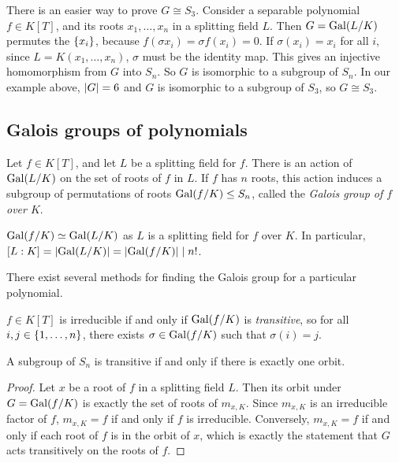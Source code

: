 There is an easier way to prove \( G \cong S_3 \).
Consider a separable polynomial \( f \in K[T] \), and its roots \( x_1, \dots, x_n \) in a splitting field \( L \).
Then \( G = \operatorname{Gal}(L / K) \) permutes the \( \qty{x_i} \), because \( f(\sigma x_i) = \sigma f(x_i) = 0 \).
If \( \sigma(x_i) = x_i \) for all \( i \), since \( L = K(x_1, \dots, x_n) \), \( \sigma \) must be the identity map.
This gives an injective homomorphism from \( G \) into \( S_n \).
So \( G \) is isomorphic to a subgroup of \( S_n \).
In our example above, \( \abs{G} = 6 \) and \( G \) is isomorphic to a subgroup of \( S_3 \), so \( G \cong S_3 \).

\subsection{Galois groups of polynomials}
\begin{definition}
	Let \( f \in K[T] \), and let \( L \) be a splitting field for \( f \).
	There is an action of \( \operatorname{Gal}(L/K) \) on the set of roots of \( f \) in \( L \).
	If \( f \) has \( n \) roots, this action induces a subgroup of permutations of roots \( \operatorname{Gal}(f/K) \leq S_n \), called the \emph{Galois group of \( f \) over \( K \)}.
\end{definition}
\begin{remark}
	\( \operatorname{Gal}(f/K) \simeq \operatorname{Gal}(L/K) \) as \( L \) is a splitting field for \( f \) over \( K \).
	In particular, \( [L : K] = \abs{\operatorname{Gal}(L/K)} = \abs{\operatorname{Gal}(f/K)} \mid n! \).
\end{remark}
There exist several methods for finding the Galois group for a particular polynomial.
\begin{proposition}
	\( f \in K[T] \) is irreducible if and only if \( \operatorname{Gal}(f/K) \) is \emph{transitive}, so for all \( i, j \in \qty{1, \dots, n} \), there exists \( \sigma \in \operatorname{Gal}(f/K) \) such that \( \sigma(i) = j \).
\end{proposition}
\begin{remark}
	A subgroup of \( S_n \) is transitive if and only if there is exactly one orbit.
\end{remark}
\begin{proof}
	Let \( x \) be a root of \( f \) in a splitting field \( L \).
	Then its orbit under \( G = \operatorname{Gal}(f/K) \) is exactly the set of roots of \( m_{x,K} \).
	Since \( m_{x,K} \) is an irreducible factor of \( f \), \( m_{x,K} = f \) if and only if \( f \) is irreducible.
	Conversely, \( m_{x,K} = f \) if and only if each root of \( f \) is in the orbit of \( x \), which is exactly the statement that \( G \) acts transitively on the roots of \( f \).
\end{proof}
